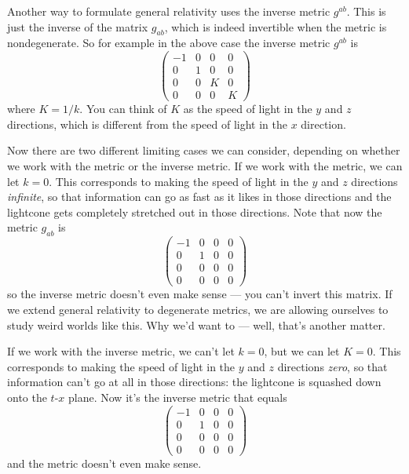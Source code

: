 \documentclass{article}
\begin{document}
\begin{itemize}
  Another way to formulate general relativity uses the inverse metric
  \(g^{ab}\). This is just the inverse of the matrix \(g_{ab}\), which
  is indeed invertible when the metric is nondegenerate. So for example
  in the above case the inverse metric \(g^{ab}\) is \[
      \left(
        \begin{array}{cccc}
          -1&0&0&0
        \\0&1&0&0
        \\0&0&K&0
        \\0&0&0&K
        \end{array}
      \right)
    \] where \(K = 1/k\). You can think of \(K\) as the speed of light
  in the \(y\) and \(z\) directions, which is different from the speed
  of light in the \(x\) direction.

  Now there are two different limiting cases we can consider, depending
  on whether we work with the metric or the inverse metric. If we work
  with the metric, we can let \(k = 0\). This corresponds to making the
  speed of light in the \(y\) and \(z\) directions \emph{infinite}, so
  that information can go as fast as it likes in those directions and
  the lightcone gets completely stretched out in those directions. Note
  that now the metric \(g_{ab}\) is \[
      \left(
        \begin{array}{cccc}
          -1&0&0&0
        \\0&1&0&0
        \\0&0&0&0
        \\0&0&0&0
        \end{array}
      \right)
    \] so the inverse metric doesn't even make sense --- you can't
  invert this matrix. If we extend general relativity to degenerate
  metrics, we are allowing ourselves to study weird worlds like this.
  Why we'd want to --- well, that's another matter.

  If we work with the inverse metric, we can't let \(k = 0\), but we can
  let \(K = 0\). This corresponds to making the speed of light in the
  \(y\) and \(z\) directions \emph{zero}, so that information can't go
  at all in those directions: the lightcone is squashed down onto the
  \(t\)-\(x\) plane. Now it's the inverse metric that equals \[
      \left(
        \begin{array}{cccc}
          -1&0&0&0
        \\0&1&0&0
        \\0&0&0&0
        \\0&0&0&0
        \end{array}
      \right)
    \] and the metric doesn't even make sense.


\end{itemize}
\end{document}
